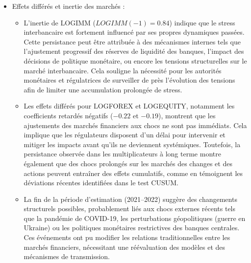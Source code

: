 \begin{itemize}
    \item Effets différés et inertie des marchés :
    \begin{itemize}
        \item L’inertie de LOGIMM (\(LOGIMM(-1) = 0.84\)) indique que le stress interbancaire est fortement influencé par ses propres dynamiques passées. Cette persistance peut être attribuée à des mécanismes internes tels que l’ajustement progressif des réserves de liquidité des banques, l’impact des décisions de politique monétaire, ou encore les tensions structurelles sur le marché interbancaire. Cela souligne la nécessité pour les autorités monétaires et régulatrices de surveiller de près l’évolution des tensions afin de limiter une accumulation prolongée de stress.
        \item Les effets différés pour LOGFOREX et LOGEQUITY, notamment les coefficients retardés négatifs (\(-0.22\) et \(-0.19\)), montrent que les ajustements des marchés financiers aux chocs ne sont pas immédiats. Cela implique que les régulateurs disposent d’un délai pour intervenir et mitiger les impacts avant qu’ils ne deviennent systémiques. Toutefois, la persistance observée dans les multiplicateurs à long terme montre également que des chocs prolongés sur les marchés des changes et des actions peuvent entraîner des effets cumulatifs, comme en témoignent les déviations récentes identifiées dans le test CUSUM.
        \item La fin de la période d’estimation (2021–2022) suggère des changements structurels possibles, probablement liés aux chocs externes récents tels que la pandémie de COVID-19, les perturbations géopolitiques (guerre en Ukraine) ou les politiques monétaires restrictives des banques centrales. Ces événements ont pu modifier les relations traditionnelles entre les marchés financiers, nécessitant une réévaluation des modèles et des mécanismes de transmission.
    \end{itemize}


\end{itemize}
